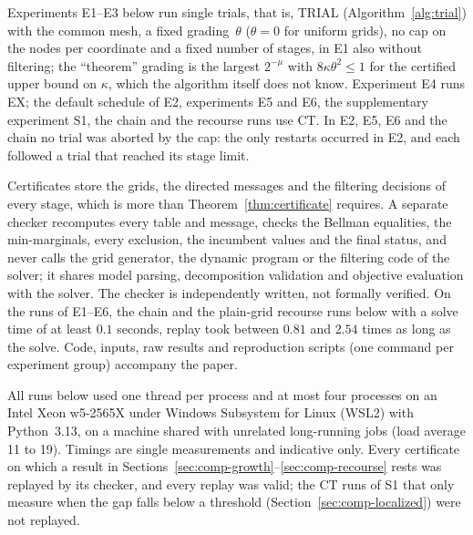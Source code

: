 Experiments E1--E3 below run single trials, that is, TRIAL
(Algorithm~\ref{alg:trial}) with the common mesh, a fixed grading~$\theta$
($\theta=0$ for uniform grids), no cap on the nodes per coordinate and a fixed
number of stages, in E1 also without filtering; the ``theorem'' grading is the
largest $2^{-\mu}$ with $8\kappa\theta^2\le1$ for the certified upper bound on
$\kappa$, which the algorithm itself does not know. Experiment E4 runs EX; the
default schedule of E2, experiments E5 and E6, the supplementary experiment
S1, the chain and the recourse runs use CT. In E2, E5, E6 and the chain no
trial was aborted by the cap: the only restarts occurred in E2, and each
followed a trial that reached its stage limit.

Certificates store the grids, the directed messages and the filtering
decisions of every stage, which is more than Theorem~\ref{thm:certificate}
requires. A separate checker recomputes every table and message, checks the
Bellman equalities, the min-marginals, every exclusion, the incumbent values
and the final status, and never calls the grid generator, the dynamic program
or the filtering code of the solver; it shares model parsing, decomposition
validation and objective evaluation with the solver. The checker is
independently written, not formally verified. On the runs of E1--E6, the
chain and the plain-grid recourse runs below with a solve time of at least
$0.1$ seconds, replay took between $0.81$ and $2.54$ times as long as the
solve. Code, inputs, raw results and reproduction scripts (one command per experiment
group) accompany the paper.

All runs below used one thread per process and at most four processes on an
Intel Xeon w5-2565X under Windows Subsystem for Linux (WSL2) with
Python~3.13, on a machine shared with unrelated long-running jobs (load
average 11 to 19). Timings are single measurements and indicative only. Every
certificate on which a result in
Sections~\ref{sec:comp-growth}--\ref{sec:comp-recourse} rests was replayed by
its checker, and every replay was valid; the CT runs of S1 that only measure
when the gap falls below a threshold (Section~\ref{sec:comp-localized}) were
not replayed.

